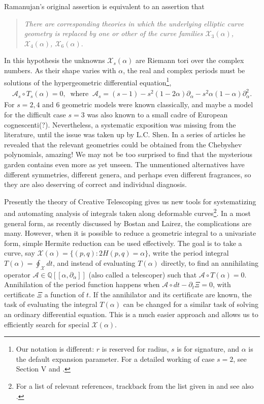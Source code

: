 \documentclass[nofootinbib,preprint]{revtex4-1}
\begin{document}
Ramanujan's original assertion is equivalent to an assertion that 
\begin{quote}
\textit{There are corresponding theories in which the underlying elliptic curve geometry 
is replaced by one or other of the curve families $\mathcal{X}_3(\alpha)$, $\mathcal{X}_4(\alpha)$, 
$\mathcal{X}_6(\alpha)$}.
\end{quote}
In this hypothesis the unknowns $\mathcal{X}_s(\alpha)$ are Riemann tori over the complex 
numbers. As their shape varies with $\alpha$, the real and complex periods must 
be solutions of the hypergeometric differential equation\footnote{Our notation is 
different: $r$ is reserved for radius, $s$ is for signature, and $\alpha$ is the 
default expansion parameter. For a detailed working of case $s=2$, see \cite{KLEE2020Prelude} 
Section V and \cite{KLEE2020Pendulum}. },
\begin{eqnarray}
\mathcal{A}_s \circ T_s(\alpha) = 0, \;\;\text{where}\;\;\mathcal{A}_s
=(s-1)-s^2(1-2\alpha)\partial_{\alpha}-s^2\alpha(1-\alpha)\partial_{\alpha}^2. \nonumber
\end{eqnarray}
For $s=2,4$ and $6$ geometric models were known classically, and maybe a model for the difficult 
case $s=3$ was also known to a small cadre of European cognescenti(?). Nevertheless, a 
systematic exposition was missing from the literature, until the issue was taken up 
by L.C. Shen. In a series of articles \cite{SHEN1998,SHEN2013,SHEN2014,SHEN2017} 
he revealed that the relevant 
geometries could be obtained from the Chebyshev polynomials, amazing! We may not 
be too surprised to find that the mysterious garden contains even more as 
yet unseen. The unmentioned alternatives have different symmetries, different genera,
and perhaps even different fragrances, so they are also deserving of correct and 
individual diagnosis.

Presently the theory of Creative Telescoping gives us new tools for systematizing
and automating analysis of integrals taken along deformable curves\footnote{For a list of 
relevant references, trackback from the list given in \cite{KLEE2020Prelude} and see also \cite{COMPLEXITY2010}.}. 
In a most general form, as recently discussed by Bostan
and Lairez, the complications are many\cite{BOSTAN2017,LAIREZ2016}. However, when it is possible 
to reduce  a geometric integral to a univariate form, simple Hermite reduction can be used effectively.
The goal is to take a curve, say $\mathcal{X}(\alpha)=\{(p,q) : 2H(p,q)=\alpha\}$, write 
the period integral $T(\alpha)=\oint_{\mathcal{X}}dt$, and instead of evaluating $T(\alpha)$
directly, to find an annihilating operator $\mathcal{A} \in \mathbb{Q}[\![\alpha,\partial_{\alpha}]\!]$
(also called a telescoper) such that $\mathcal{A} \circ T(\alpha)=0$. Annihilation of the 
period function happens when $\mathcal{A} \circ dt -\partial_t \Xi = 0$, with certificate
$\Xi$ a function of $t$. If the annihilator and its certificate are known, the task of 
evaluating the integral $T(\alpha)$ can be changed for a similar task of solving an
ordinary differential equation. This is a much easier approach and allows us to efficiently
search for special $\mathcal{X}(\alpha)$. 
\end{document}
